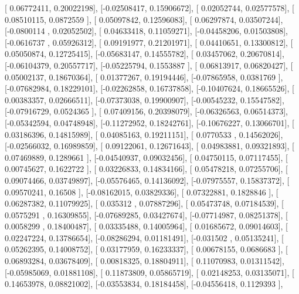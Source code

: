 \documentclass{article}
\begin{document}
       [ 0.06772411,  0.20022198],
       [-0.02508417,  0.15906672],
       [ 0.02052744,  0.02577578],
       [ 0.08510115,  0.0872559 ],
       [ 0.05097842,  0.12596083],
       [ 0.06297874,  0.03507244],
       [-0.0800114 ,  0.02052502],
       [ 0.04633418,  0.11059271],
       [-0.04458206,  0.01503808],
       [-0.0616737 ,  0.05926312],
       [ 0.09191977,  0.21201971],
       [ 0.04410651,  0.13300812],
       [ 0.05050874,  0.12725415],
       [-0.05683147,  0.14555782],
       [ 0.03457062,  0.20670814],
       [-0.06104379,  0.20557717],
       [-0.05225794,  0.1553887 ],
       [ 0.06813917,  0.06820427],
       [ 0.05002137,  0.18670364],
       [ 0.01377267,  0.19194446],
       [-0.07865958,  0.0381769 ],
       [-0.07682984,  0.18229101],
       [-0.02262858,  0.16737858],
       [-0.10407624,  0.18665526],
       [ 0.00383357,  0.02666511],
       [-0.07373038,  0.19900907],
       [-0.00545232,  0.15547582],
       [-0.07916729,  0.0524365 ],
       [ 0.07409156,  0.20398079],
       [-0.06326563,  0.06514373],
       [-0.05342594,  0.04748948],
       [-0.11272952,  0.18242761],
       [-0.10676227,  0.13066701],
       [ 0.03186396,  0.14815989],
       [ 0.04085163,  0.19211151],
       [ 0.0770533 ,  0.14562026],
       [-0.02566032,  0.16989859],
       [ 0.09122061,  0.12671643],
       [ 0.04983881,  0.09321893],
       [ 0.07469889,  0.1289661 ],
       [-0.04540937,  0.09032456],
       [ 0.04750115,  0.07117455],
       [ 0.00745627,  0.1622722 ],
       [ 0.03226833,  0.14834166],
       [ 0.05478218,  0.07255706],
       [ 0.09074466,  0.03749897],
       [-0.05576465,  0.14136092],
       [-0.07975557,  0.15837372],
       [ 0.09570241,  0.16508   ],
       [-0.08162015,  0.03829336],
       [ 0.07322881,  0.1828846 ],
       [ 0.06287382,  0.11079925],
       [ 0.035312  ,  0.07887296],
       [ 0.05473748,  0.07184539],
       [ 0.0575291 ,  0.16309855],
       [-0.07689285,  0.03427674],
       [-0.07714987,  0.08251378],
       [ 0.0058299 ,  0.18400487],
       [ 0.03335488,  0.14005964],
       [ 0.01685672,  0.09014603],
       [ 0.02247224,  0.13786654],
       [-0.08286294,  0.01181491],
       [-0.031502  ,  0.05135241],
       [ 0.05262395,  0.14008752],
       [ 0.03177959,  0.16233337],
       [ 0.00678155,  0.0686683 ],
       [ 0.06893284,  0.03678409],
       [ 0.00818325,  0.18804911],
       [ 0.11070983,  0.01311542],
       [-0.05985069,  0.01881108],
       [ 0.11873809,  0.05865719],
       [ 0.02148253,  0.03135071],
       [ 0.14653978,  0.08821002],
       [-0.03553834,  0.18184458],
       [-0.04556418,  0.1129393 ],
\end{document}
